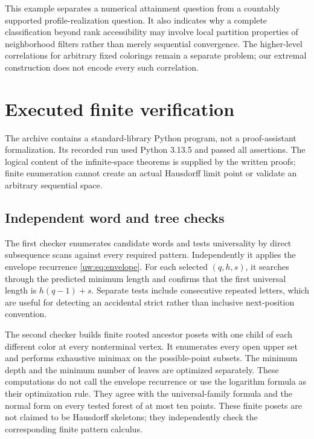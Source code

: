 \documentclass[11pt,letterpaper]{article}
\numberwithin{equation}{section}
\theoremstyle{definition}
\theoremstyle{remark}
\theoremstyle{definition}
\begin{document}
This example separates a numerical attainment question from a countably
supported profile-realization question. It also indicates why a complete
classification beyond rank accessibility may involve local partition
properties of neighborhood filters rather than merely sequential convergence.
The higher-level correlations for arbitrary fixed colorings remain a separate
problem; our extremal construction does not encode every such correlation.

\section{Executed finite verification}\label{uw:sec:verification}

The archive contains a standard-library Python program, not a
proof-assistant formalization. Its recorded run used Python 3.13.5 and passed
all assertions. The logical content of the infinite-space theorems is supplied
by the written proofs; finite enumeration cannot create an actual Hausdorff
limit point or validate an arbitrary sequential space.

\subsection{Independent word and tree checks}
The first checker enumerates candidate words and tests universality by direct
subsequence scans against every required pattern. Independently it applies
the envelope recurrence \eqref{uw:eq:envelope}. For each selected $(q,h,s)$, it
searches through the predicted minimum length and confirms that the first
universal length is $h(q-1)+s$. Separate tests include consecutive repeated
letters, which are useful for detecting an accidental strict rather than
inclusive next-position convention.

The second checker builds finite rooted ancestor posets with one child of
each different color at every nonterminal vertex. It enumerates every open
upper set and performs exhaustive minimax on the possible-point subsets.
The minimum depth and the minimum number of leaves are optimized separately.
These computations do not call the envelope recurrence or use the logarithm
formula as their optimization rule. They agree with the universal-family
formula and the normal form on every tested forest of at most ten points.
These finite posets are not claimed to be Hausdorff skeletons; they independently
check the corresponding finite pattern calculus.
\end{document}
